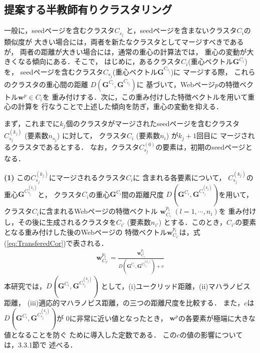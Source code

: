 \documentclass[japanese]{jnlp_1.4}
\begin{document}
\subsection{提案する半教師有りクラスタリング} \label{subsec:SSCls}

一般に，seedページを含むクラスタ$C_{s_{j}}$
と，seedページを含まないクラスタ$C_{i}$の類似度が
大きい場合には，両者を新たなクラスタとしてマージすべきであるが，
両者の距離が大きい場合には，通常の重心の計算法では，
重心の変動が大きくなる傾向にある．そこで，
はじめに，あるクラスタ$C_{i}$(重心ベクトル$\boldsymbol{G}^{C_{i}}$)を，
seedページを含むクラスタ$C_{s_{j}}$(重心ベクトル$\boldsymbol{G}^{C_{s_{j}}}$)に
マージする際，
これらのクラスタの重心間の距離
$D(\boldsymbol{G}^{C_{i}},\boldsymbol{G}^{C_{s_{j}}})$に
基づいて，Webページ$p$の特徴ベクトル$\boldsymbol{w}^{p}\in C_{i}$を
重み付けする．次に，この重み付けした特徴ベクトルを用いて重心の計算を
行なうことで上述した傾向を防ぎ，重心の変動を抑える．

まず，これまでに$k_{j}$個のクラスタがマージされたseedページを含むクラスタ
$C_{s_{j}}^{(k_{j})}$ (要素数$n_{s_{j}}$) に対して，
クラスタ$C_{i}$ (要素数$n_{i}$) が$k_{j}+1$回目に
マージされるクラスタであるとする．
なお，クラスタ$C_{s_{j}}^{(0)}$の要素は，初期のseedページとなる．

\noindent
\textbf{(1)} この$C_{s_{j}}^{(k_{j})}$にマージされるクラスタ$C_{i}$に
含まれる各要素について，
$C_{s_{j}}^{(k_{j})}$の重心$\boldsymbol{G}^{C_{s_{j}}^{(k_{j})}}$と，
クラスタ$C_{i}$の重心$\boldsymbol{G}^{C_{i}}$間の距離尺度
$D(\boldsymbol{G}^{C_{i}},\boldsymbol{G}^{C_{s_{j}}^{(k_{j})}})$を用いて，
クラスタ$C_{i}$に含まれるWebページの特徴ベクトル
$\boldsymbol{w}^{p_{l}}_{C_{i}}$ $(l=1,\cdots ,n_{i})$を
重み付けし，その後に生成されるクラスタを$C_{i'}$ (要素数$n_{i'}$) 
とする．このとき，$C_{i'}$の要素となる重み付けした後のWebページの
特徴ベクトル$\boldsymbol{w}^{p_{l}}_{C_{i'}}$は，式(\ref{eq:TransferedCor})で表される．
\begin{eqnarray}
\boldsymbol{w}^{p_{l}}_{C_{i'}}
=\frac{\boldsymbol{w}^{p_{l}}_{C_{i}}}{D(\boldsymbol{G}^{C_{i}},\boldsymbol{G}^{C_{s_{j}}^{(k_{j})}})+c} \label{eq:TransferedCor}
\end{eqnarray}
本研究では，$D(\boldsymbol{G}^{C_{i}},\boldsymbol{G}^{C_{s_{j}}^{(k_{j})}})$
として，(i)ユークリッド距離，(ii)マハラノビス距離，
(iii)適応的マハラノビス距離，の三つの距離尺度を比較する．
また，$c$は$D(\boldsymbol{G}^{C_{i}},\boldsymbol{G}^{C_{s_{j}}^{(k_{j})}})$が
0に非常に近い値となったとき，
$\boldsymbol{w}^{p}$の各要素が極端に大きな値となることを防ぐ
ために導入した定数である．
この$c$の値の影響については，3.3.1節で
述べる．
\end{document}
